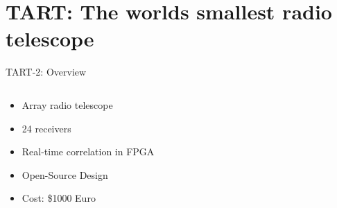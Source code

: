\documentclass[ignorenonframetext]{beamer}
\begin{document}
\section{TART: The worlds smallest radio telescope}

\frame{\tableofcontents[currentsection]}

% 
% 



\begin{frame}{TART-2: Overview}
 \begin{columns}
  \begin{column}{0.4\linewidth}
   \begin{itemize}
    \item Array radio telescope
    \item 24 receivers
    \item Real-time correlation in FPGA
    \item Open-Source Design
    \item Cost: \$1000 Euro
   \end{itemize}
   \begin{center}

\end{center}
\end{column}
\end{columns}
\end{frame}
\end{document}
